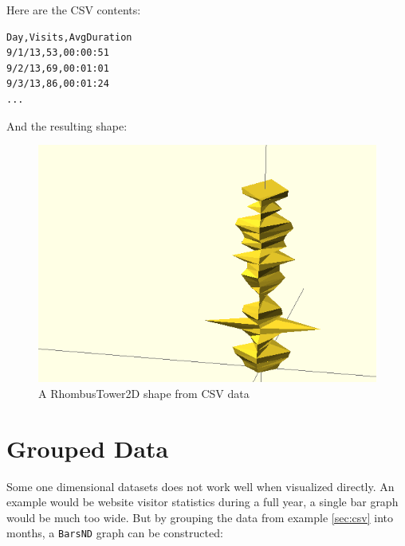 \noindent Here are the CSV contents:

\vspace{.5\baselineskip}
\begin{verbatim}
Day,Visits,AvgDuration
9/1/13,53,00:00:51
9/2/13,69,00:01:01
9/3/13,86,00:01:24
...
\end{verbatim}
\vspace{.5\baselineskip}

\noindent And the resulting shape:

\begin{figure}[H]
	\centering
	\includegraphics[height=.20\textheight]{images/csv.png}
	\caption{A RhombusTower2D shape from CSV data}
	\label{img:angle_pie}
\end{figure}



\newpage
\section{Grouped Data}\label{sec:tower}

Some one dimensional datasets does not work well when visualized directly. An
example would be website visitor statistics during a full year, a single bar
graph would be much too wide. But by grouping the data from example
\ref{sec:csv} into months, a \texttt{BarsND} graph can be constructed:


